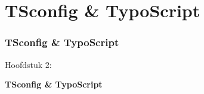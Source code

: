 %

\section{TSconfig \& TypoScript}
\begin{frame}[fragile]
	\frametitle{TSconfig \& TypoScript}

	\begin{center}\huge{Hoofdstuk 2:}\end{center}
	\begin{center}\huge{\color{typo3darkgrey}\textbf{TSconfig \& TypoScript}}\end{center}

\end{frame}

